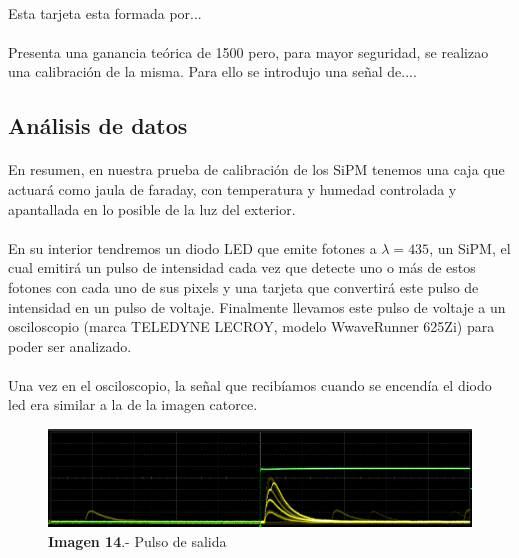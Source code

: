 \documentclass[11pt, a4paper]{article}
\begin{document}
\paragraph {}
Esta tarjeta esta formada por...%

\paragraph {}
Presenta una ganancia teórica de 1500 pero, para mayor seguridad, se realizao una calibración de la misma. Para ello se introdujo una señal de....	

\subsection {Análisis de datos}
\paragraph {}
En resumen, en nuestra prueba de calibración de los SiPM tenemos una caja que actuará como jaula de faraday, con temperatura y humedad controlada y apantallada en lo posible de la luz del exterior. 

\paragraph {}
En su interior tendremos un diodo LED que emite fotones a $\lambda=435$, un SiPM, el cual emitirá un pulso de intensidad cada vez que detecte uno o más de estos fotones con cada uno de sus pixels y una tarjeta que convertirá este pulso de intensidad en un pulso de voltaje. Finalmente llevamos este pulso de voltaje a un osciloscopio (marca TELEDYNE LECROY, modelo WwaveRunner 625Zi) para poder ser analizado. 

\paragraph {}
Una vez en el osciloscopio, la señal que recibíamos cuando se encendía el diodo led era similar a la de la imagen catorce.

\begin{figure}[hbtp]
\centering
\includegraphics[scale=0.2]{PulsoSalida.png}
\caption{\textbf{Imagen 14}.- Pulso de salida}
\end{figure}
\end{document}
